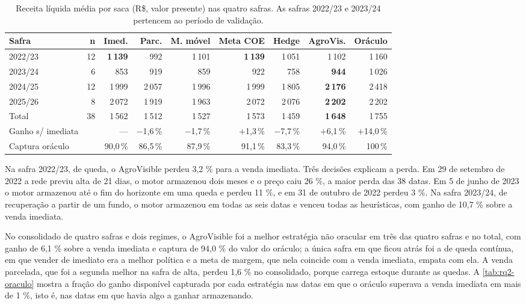 \begin{table}[htb]
	\centering
	\caption{Receita líquida média por saca (R\$, valor presente) nas quatro safras. As safras 2022/23 e 2023/24 pertencem ao período de validação.}\label{tab:rq2-4safras}
	\footnotesize
	\setlength{\tabcolsep}{3.5pt}
	\begin{tabular}{l r r r r r r r r}
		\hline
		\textbf{Safra} & \textbf{n} & \textbf{Imed.} & \textbf{Parc.} & \textbf{M. móvel} & \textbf{Meta COE} & \textbf{Hedge} & \textbf{AgroVis.} & \textbf{Oráculo} \\ \hline
		2022/23 & 12 & \textbf{1\,139} & 992 & 1\,101 & \textbf{1\,139} & 1\,051 & 1\,102 & 1\,160 \\
		2023/24 & 6  & 853 & 919 & 859 & 922 & 758 & \textbf{944} & 1\,026 \\
		2024/25 & 12 & 1\,999 & 2\,057 & 1\,996 & 1\,999 & 1\,805 & \textbf{2\,176} & 2\,418 \\
		2025/26 & 8  & 2\,072 & 1\,919 & 1\,963 & 2\,072 & 2\,076 & \textbf{2\,202} & 2\,202 \\ \hline
		Total   & 38 & 1\,562 & 1\,512 & 1\,527 & 1\,573 & 1\,459 & \textbf{1\,648} & 1\,755 \\
		Ganho s/ imediata & & --- & $-$1,6\,\% & $-$1,7\,\% & $+$1,3\,\% & $-$7,7\,\% & $+$6,1\,\% & $+$14,0\,\% \\
		Captura oráculo & & 90,0\,\% & 86,5\,\% & 87,9\,\% & 91,1\,\% & 83,3\,\% & 94,0\,\% & 100\,\% \\ \hline
	\end{tabular}
\end{table}

Na safra 2022/23, de queda, o AgroVisible perdeu 3,2 \% para a venda imediata. Três decisões explicam a perda. Em 29 de setembro de 2022 a rede previu alta de 21 dias, o motor armazenou dois meses e o preço caiu 26 \%, a maior perda das 38 datas. Em 5 de junho de 2023 o motor armazenou até o fim do horizonte em uma queda e perdeu 11 \%, e em 31 de outubro de 2022 perdeu 3 \%. Na safra 2023/24, de recuperação a partir de um fundo, o motor armazenou em todas as seis datas e venceu todas as heurísticas, com ganho de 10,7 \% sobre a venda imediata.

No consolidado de quatro safras e dois regimes, o AgroVisible foi a melhor estratégia não oracular em três das quatro safras e no total, com ganho de 6,1 \% sobre a venda imediata e captura de 94,0 \% do valor do oráculo; a única safra em que ficou atrás foi a de queda contínua, em que vender de imediato era a melhor política e a meta de margem, que nela coincide com a venda imediata, empata com ela. A venda parcelada, que foi a segunda melhor na safra de alta, perdeu 1,6 \% no consolidado, porque carrega estoque durante as quedas. A \autoref{tab:rq2-oraculo} mostra a fração do ganho disponível capturada por cada estratégia nas datas em que o oráculo superava a venda imediata em mais de 1 \%, isto é, nas datas em que havia algo a ganhar armazenando.

